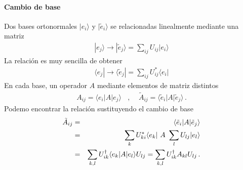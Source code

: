 \documentclass[letterpaper,10pt,english]{jupyterBook}
\newcommand{\bra}[1]{\langle #1|}
\newcommand{\ket}[1]{|#1\rangle}
\begin{document}
\paragraph{Cambio de base}
\label{\detokenize{docs/Part_01_Formalismo/Chapter_01_02_Formalismo_matem_xe1tico/01_03_Operadores_myst:cambio-de-base}}
\sphinxAtStartPar
Dos bases ortonormales \(\ket{e_i}\) y \(\ket{\tilde e_i}\) se relacionadas linealmente mediante una matriz
\begin{equation*}
\begin{split} \ket{e_j} \to \ket{\tilde e_j} = \sum_{ij}U_{ij} \ket{e_i}\end{split}
\end{equation*}
\sphinxAtStartPar
La relación  es muy sencilla de obtener
\begin{equation*}
\begin{split} \bra{e_j} \to \bra{\tilde e_j} = \sum_{ij}U^*_{ij} \bra{e_i}\end{split}
\end{equation*}
\sphinxAtStartPar
En cada base, un operador \(A\)  mediante elementos de matriz distintos
\begin{equation*}
\begin{split}
 A_{ij} = \bra{e_i} A \ket{e_j} ~~~~,~~~~~ \tilde A_{ij} = \bra{\tilde e_i} A \ket{\tilde e_j} \, .
\end{split}
\end{equation*}
\sphinxAtStartPar
Podemo encontrar la relación sustituyendo el cambio de base
\begin{eqnarray*}
\tilde A_{ij} &=& \bra{\tilde e_i} A \ket{\tilde e_j} \\ \rule{0mm}{8mm}
&=& \sum_{k}U^*_{ki}\bra{e_k} ~A~ \sum_l U_{lj}\ket{e_l} \\ 
&=&  \sum_{k,l} U^\dagger_{ik}\bra{e_k} A  \ket{e_l}U_{lj}   = \sum_{k,l} U^\dagger_{ik}A_{kl} U_{lj} \, .
\end{eqnarray*}
\end{document}

